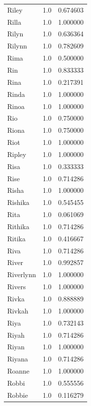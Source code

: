 \documentclass[
  letterpaper,
  DIV=11,
  numbers=noendperiod]{scrreprt}
\begin{document}
\begin{tabular}{lrr}
Riley           &   1.0 &   0.674603 \\
Rilla           &   1.0 &   1.000000 \\
Rilyn           &   1.0 &   0.636364 \\
Rilynn          &   1.0 &   0.782609 \\
Rima            &   1.0 &   0.500000 \\
Rin             &   1.0 &   0.833333 \\
Rina            &   1.0 &   0.217391 \\
Rinda           &   1.0 &   1.000000 \\
Rinoa           &   1.0 &   1.000000 \\
Rio             &   1.0 &   0.750000 \\
Riona           &   1.0 &   0.750000 \\
Riot            &   1.0 &   1.000000 \\
Ripley          &   1.0 &   1.000000 \\
Risa            &   1.0 &   0.333333 \\
Rise            &   1.0 &   0.714286 \\
Risha           &   1.0 &   1.000000 \\
Rishika         &   1.0 &   0.545455 \\
Rita            &   1.0 &   0.061069 \\
Rithika         &   1.0 &   0.714286 \\
Ritika          &   1.0 &   0.416667 \\
Riva            &   1.0 &   0.714286 \\
River           &   1.0 &   0.992857 \\
Riverlynn       &   1.0 &   1.000000 \\
Rivers          &   1.0 &   1.000000 \\
Rivka           &   1.0 &   0.888889 \\
Rivkah          &   1.0 &   1.000000 \\
Riya            &   1.0 &   0.732143 \\
Riyah           &   1.0 &   0.714286 \\
Riyan           &   1.0 &   1.000000 \\
Riyana          &   1.0 &   0.714286 \\
Roanne          &   1.0 &   1.000000 \\
Robbi           &   1.0 &   0.555556 \\
Robbie          &   1.0 &   0.116279 \\

\end{tabular}
\end{document}
